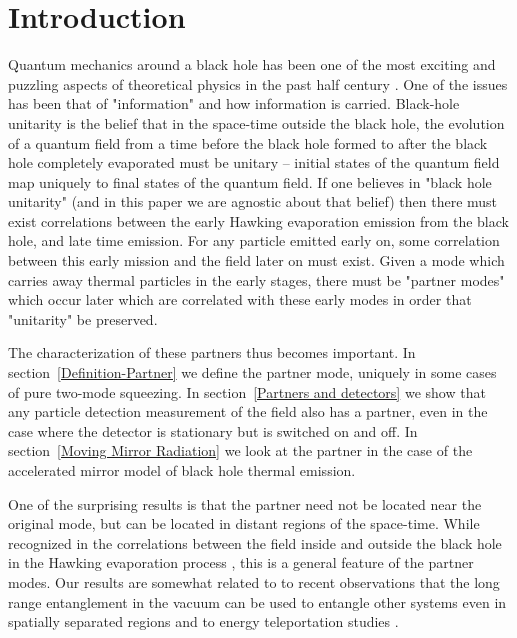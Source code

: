 \documentclass[aps,prd,showpacs,amssymb,nofootinbib,12pt]{revtex4-2}
\begin{document}
\section{Introduction}

Quantum mechanics around a black hole has been one of the most exciting and
puzzling aspects of theoretical physics in the past half century 
\cite{hawking}. 
%
One of the issues has been that of "information" and how information is carried.
%
Black-hole unitarity \cite{unitarity} is the belief that in the space-time 
outside the black hole, the evolution of a quantum field from a time before 
the black hole formed to after the black hole completely evaporated must be 
unitary -- initial states of the quantum field map uniquely to final states 
of the quantum field. 
%
If one believes in "black hole unitarity" (and in this paper we are agnostic 
about that belief) then there must exist correlations between the early 
Hawking evaporation emission from the black hole, and late time emission. 
%
For any particle emitted early on, some correlation between this early 
mission and the field later on must exist. 
%
Given a mode which carries away thermal particles in the early stages, 
there must be "partner modes" which occur later which are correlated with 
these early modes in order  that "unitarity" be preserved. 

The characterization of these partners thus becomes important. 
%
In section~\ref{Definition-Partner} we define the partner mode, 
uniquely in some cases of pure two-mode squeezing. 
%
In section~\ref{Partners and detectors} we show that any particle detection 
measurement of the field also has a partner, even in the case where the 
detector is stationary but is switched on and off. 
%
In section~\ref{Moving Mirror Radiation} we look at the partner in the case 
of the accelerated mirror model of black hole thermal emission. 

One of the surprising results is that the partner need not be located near the
original mode, but can be located in distant regions of the space-time. 
%
While recognized in the correlations between the field inside and outside the 
black hole in the Hawking evaporation process \cite{SU}, this is a general 
feature of the partner modes.
%
Our results are somewhat related to to recent observations that the long range
entanglement in the vacuum can be used to entangle other systems even in
spatially separated regions \cite{reznik} and to energy teleportation studies 
\cite{hotta}.
\end{document}
